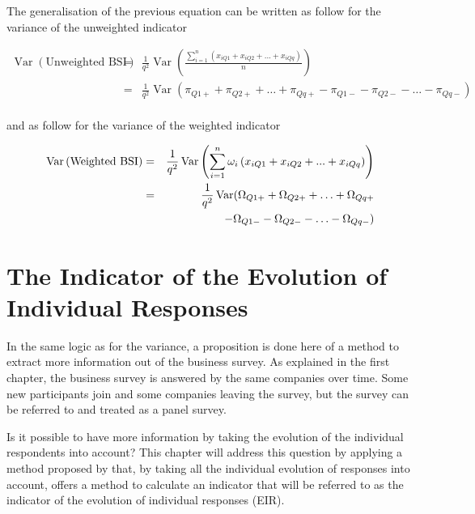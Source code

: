 \documentclass[12pt,a4paper,oneside]{book}
\DeclareMathOperator{\Var}{Var}
\begin{document}
The generalisation of the previous equation can be written as follow for the variance of the unweighted indicator

\begin{eqnarray}
    \Var \left(\text{Unweighted BSI} \right) 
    &=& \frac{1}{q^2} \Var \left(\frac{\sum_{i=1}^n \left( x_{i Q1} + x_{i Q2} + ... + x_{i Qq} \right)}{n} \right) \nonumber \\
    &=& \frac{1}{q^2} \Var \left(\pi_{Q1+} + \pi_{Q2+} + \ldots + \pi_{Qq+} - \pi_{Q1-} - \pi_{Q2-} - \ldots - \pi_{Qq-} \right) \nonumber \\
\end{eqnarray}

and as follow for the variance of the weighted indicator

\begin{eqnarray}
    \Var \left(\text{Weighted BSI} \right) 
    &=& \frac{1}{q^2} \Var \left( \sum_{i=1}^n \omega_i \left(x_{i Q1} + x_{i Q2} + ... + x_{i Qq} \right) \right) \nonumber \\
    &=& \frac{1}{q^2} \Var \Large(\Omega_{Q1+} + \Omega_{Q2+} + \ldots + \Omega_{Qq+} \nonumber \\
    && - \Omega_{Q1-} - \Omega_{Q2-} - \ldots - \Omega_{Qq-} \Large)
\end{eqnarray}




\chapter{The Indicator of the Evolution of Individual Responses}

In the same logic as for the variance, a proposition is done here of a method to extract more information out of the business survey. 
As explained in the first chapter, the business survey is answered by the same companies over time. Some new participants join and some companies leaving the survey, but the survey can be referred to and treated as a panel survey.

Is it possible to have more information by taking the evolution of the individual respondents into account? 
This chapter will address this question by applying a method proposed by \cite{caron_estimation_1996} that, by taking all the individual evolution of responses into account, offers a method to calculate an indicator that will be referred to as the indicator of the evolution of individual responses (EIR).

\end{document}
